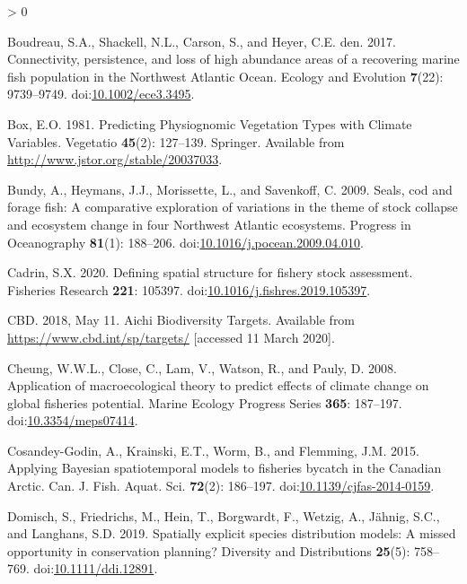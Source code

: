\documentclass[
]{article}
\newlength{\cslhangindent}
\newenvironment{CSLReferences}[2] %
 {%
  \setlength{\parindent}{0pt}
  \ifodd #1 \everypar{\setlength{\hangindent}{\cslhangindent}}\ignorespaces\fi
  \ifnum #2 > 0
  \setlength{\parskip}{#2\baselineskip}
  \fi
 }%
 {}
\begin{document}
\begin{CSLReferences}{1}{0}
\leavevmode\hypertarget{ref-boudreauConnectivityPersistenceLoss2017}{}%
Boudreau, S.A., Shackell, N.L., Carson, S., and Heyer, C.E. den. 2017. Connectivity, persistence, and loss of high abundance areas of a recovering marine fish population in the {Northwest Atlantic Ocean}. Ecology and Evolution \textbf{7}(22): 9739--9749. doi:\href{https://doi.org/10.1002/ece3.3495}{10.1002/ece3.3495}.

\leavevmode\hypertarget{ref-boxPredictingPhysiognomicVegetation1981}{}%
Box, E.O. 1981. Predicting {Physiognomic Vegetation Types} with {Climate Variables}. Vegetatio \textbf{45}(2): 127--139. {Springer}. Available from \url{http://www.jstor.org/stable/20037033}.

\leavevmode\hypertarget{ref-bundySealsCodForage2009}{}%
Bundy, A., Heymans, J.J., Morissette, L., and Savenkoff, C. 2009. Seals, cod and forage fish: {A} comparative exploration of variations in the theme of stock collapse and ecosystem change in four {Northwest Atlantic} ecosystems. Progress in Oceanography \textbf{81}(1): 188--206. doi:\href{https://doi.org/10.1016/j.pocean.2009.04.010}{10.1016/j.pocean.2009.04.010}.

\leavevmode\hypertarget{ref-cadrinDefiningSpatialStructure2020a}{}%
Cadrin, S.X. 2020. Defining spatial structure for fishery stock assessment. Fisheries Research \textbf{221}: 105397. doi:\href{https://doi.org/10.1016/j.fishres.2019.105397}{10.1016/j.fishres.2019.105397}.

\leavevmode\hypertarget{ref-cbdAichiBiodiversityTargets2018}{}%
CBD. 2018, May 11. Aichi {Biodiversity Targets}. Available from \url{https://www.cbd.int/sp/targets/} {[}accessed 11 March 2020{]}.

\leavevmode\hypertarget{ref-cheungApplicationMacroecologicalTheory2008}{}%
Cheung, W.W.L., Close, C., Lam, V., Watson, R., and Pauly, D. 2008. Application of macroecological theory to predict effects of climate change on global fisheries potential. Marine Ecology Progress Series \textbf{365}: 187--197. doi:\href{https://doi.org/10.3354/meps07414}{10.3354/meps07414}.

\leavevmode\hypertarget{ref-cosandey-godinApplyingBayesianSpatiotemporal2015}{}%
Cosandey-Godin, A., Krainski, E.T., Worm, B., and Flemming, J.M. 2015. Applying {Bayesian} spatiotemporal models to fisheries bycatch in the {Canadian Arctic}. Can. J. Fish. Aquat. Sci. \textbf{72}(2): 186--197. doi:\href{https://doi.org/10.1139/cjfas-2014-0159}{10.1139/cjfas-2014-0159}.

\leavevmode\hypertarget{ref-domischSpatiallyExplicitSpecies2019}{}%
Domisch, S., Friedrichs, M., Hein, T., Borgwardt, F., Wetzig, A., Jähnig, S.C., and Langhans, S.D. 2019. Spatially explicit species distribution models: {A} missed opportunity in conservation planning? Diversity and Distributions \textbf{25}(5): 758--769. doi:\href{https://doi.org/10.1111/ddi.12891}{10.1111/ddi.12891}.


\end{CSLReferences}
\end{document}
